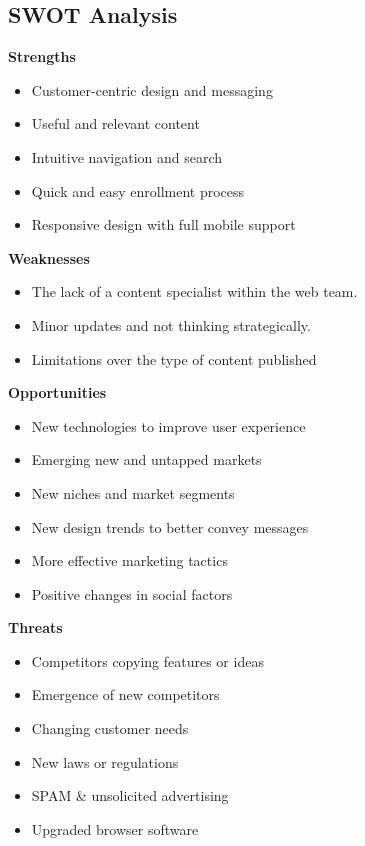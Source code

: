 \documentclass[12pt,a4paper,titlepage]{article}
\begin{document}
\subsection{SWOT Analysis}
\noindent\textbf{Strengths}
\begin{itemize}
	\item Customer-centric design and messaging
	\item Useful and relevant content
	\item Intuitive navigation and search
	\item Quick and easy enrollment process
	\item Responsive design with full mobile support
\end{itemize}
\textbf{Weaknesses}
\begin{itemize}
	\item The lack of a content specialist within the web team.
	\item Minor updates and not thinking strategically.
	\item Limitations over the type of content published
\end{itemize}
\textbf{Opportunities}
\begin{itemize}
	\item New technologies to improve user experience
	\item Emerging new and untapped markets
	\item New niches and market segments
	\item New design trends to better convey messages
	\item More effective marketing tactics
	\item Positive changes in social factors
\end{itemize}
\textbf{Threats}
\begin{itemize}
	\item Competitors copying features or ideas
	\item Emergence of new competitors
	\item Changing customer needs
	\item New laws or regulations
	\item SPAM \& unsolicited advertising
	\item Upgraded browser software
\end{itemize}
\end{document}
